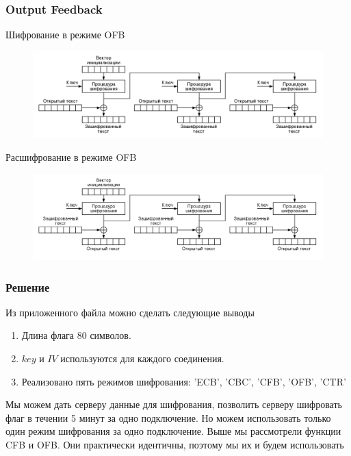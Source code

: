 \documentclass[10pt, typeface=serif(roman), pdf,hyperref={unicode}, aspectratio=169]{beamer}
\begin{document}
\begin{frame}
	\frametitle{Output Feedback}
	\begin{block}
		{
			Шифрование в режиме OFB
		}
		\begin{figure}
			\includegraphics[scale=0.14]{Шифрование в режиме OFB.png}	
		\end{figure}
	\end{block}
	\begin{block}
		{
			Расшифрование в режиме OFB
		}
		\begin{figure}
			\includegraphics[scale=0.22]{Расшифрование в режиме OFB.png}	
		\end{figure}
	\end{block}
\end{frame}



\begin{frame}
	\frametitle{Решение}
	\begin{block}
		{
			Из приложенного файла можно сделать следующие выводы
		}
		\begin{enumerate}
			\item Длина флага 80 символов.
			\item \(key\) и \(IV\) используются для каждого соединения.
			\item Реализовано пять режимов шифрования: 'ECB', 'CBC', 'CFB', 'OFB', 'CTR'
		\end{enumerate}
	\end{block}
	Мы можем дать серверу данные для шифрования, позволить серверу шифровать флаг в течении 5 минут за одно подключение. Но можем использовать только один режим шифрования за одно подключение.
	Выше мы рассмотрели функции CFB и OFB. Они практически идентичны, поэтому мы их и будем использовать
\end{frame}
\end{document}
